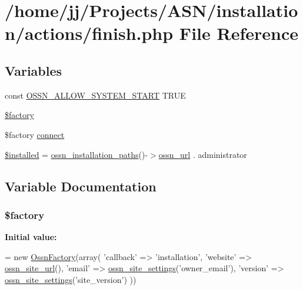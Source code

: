 \hypertarget{finish_8php}{}\section{/home/jj/\+Projects/\+A\+S\+N/installation/actions/finish.php File Reference}
\label{finish_8php}
\subsection*{Variables}
\begin{DoxyCompactItemize}
\item 
const \hyperlink{finish_8php_a73aeae1243c8451cb328ddfe84637175}{O\+S\+S\+N\+\_\+\+A\+L\+L\+O\+W\+\_\+\+S\+Y\+S\+T\+E\+M\+\_\+\+S\+T\+A\+RT} T\+R\+UE
\item 
\hyperlink{finish_8php_a099b374dc664ee043fffcd6ea05e3e70}{\$factory}
\item 
\$factory \hyperlink{finish_8php_a3fdbedd7713e458f25fcf7dc1f562a3d}{connect}
\item 
\hyperlink{finish_8php_abedccaa71dcf3d3f5c392fad3b3df965}{\$installed} = \hyperlink{ossn_8install_8php_aee293727c85b476f39c8c4d5a1774b48}{ossn\+\_\+installation\+\_\+paths}()-\/$>$\hyperlink{ossn_8install_8php_a97af879f91996487b1093c01e33689f8}{ossn\+\_\+url} . \textquotesingle{}administrator\textquotesingle{}
\end{DoxyCompactItemize}


\subsection{Variable Documentation}
\subsubsection[{\texorpdfstring{\$factory}{$factory}}]{\setlength{\rightskip}{0pt plus 5cm}\$factory}\hypertarget{finish_8php_a099b374dc664ee043fffcd6ea05e3e70}{}\label{finish_8php_a099b374dc664ee043fffcd6ea05e3e70}
{\bfseries Initial value\+:}
\begin{DoxyCode}
= \textcolor{keyword}{new} \hyperlink{class_ossn_factory}{OssnFactory}(array(
        \textcolor{stringliteral}{'callback'} => \textcolor{stringliteral}{'installation'},
        \textcolor{stringliteral}{'website'} => \hyperlink{ossn_8lib_8system_8php_a2f12f9244f99eccd1225afb76ef2ab65}{ossn\_site\_url}(),
        \textcolor{stringliteral}{'email'} => \hyperlink{ossn_8lib_8system_8php_a610e2045b8a86c09f777b4d82e24e34c}{ossn\_site\_settings}(\textcolor{stringliteral}{'owner\_email'}),
        \textcolor{stringliteral}{'version'} => \hyperlink{ossn_8lib_8system_8php_a610e2045b8a86c09f777b4d82e24e34c}{ossn\_site\_settings}(\textcolor{stringliteral}{'site\_version'})
))
\end{DoxyCode}


